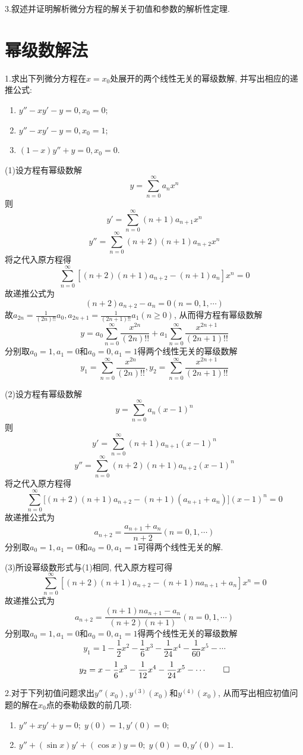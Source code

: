 3.叙述并证明解析微分方程的解关于初值和参数的解析性定理.


\section{幂级数解法}


1.求出下列微分方程在$x=x_0$处展开的两个线性无关的幂级数解, 并写出相应的递推公式:
\begin{enumerate}[(1)]
\item $y''-xy'-y=0,x_0=0$;
\item $y''-xy'-y=0,x_0=1$;
\item $(1-x)y''+y=0,x_0=0$.
\end{enumerate}

\begin{solve}
(1)设方程有幂级数解\[y=\sum_{n=0}^{\infty}a_nx^n\] 则
\[y'=\sum_{n=0}^{\infty}(n+1)a_{n+1}x^n\]
\[y''=\sum_{n=0}^{\infty}(n+2)(n+1)a_{n+2}x^n\]
将之代入原方程得\[\sum_{n=0}^{\infty}[(n+2)(n+1)a_{n+2}-(n+1)a_n]x^n=0\]
故递推公式为\[(n+2)a_{n+2}-a_n=0(n=0,1,\cdots)\]
故$a_{2n}=\frac{1}{(2n)!!}a_0,a_{2n+1}=\frac{1}{(2n+1)!!}a_1(n\geq0)$, 从而得方程有幂级数解
\[y=a_0\sum_{n=0}^{\infty}\frac{x^{2n}}{(2n)!!}+a_1\sum_{n=0}^{\infty}\frac{x^{2n+1}}{(2n+1)!!}\]
分别取$a_0=1,a_1=0$和$a_0=0,a_1=1$得两个线性无关的幂级数解
\[y_1=\sum_{n=0}^{\infty}\frac{x^{2n}}{(2n)!!},y_2=\sum_{n=0}^{\infty}\frac{x^{2n+1}}{(2n+1)!!}\]

(2)设方程有幂级数解\[y=\sum_{n=0}^{\infty}a_n(x-1)^n\]
则\[y'=\sum_{n=0}^{\infty}(n+1)a_{n+1}(x-1)^n\]
\[y''=\sum_{n=0}^{\infty}(n+2)(n+1)a_{n+2}(x-1)^n\]
将之代入原方程得
\[\sum_{n=0}^{\infty}\big[(n+2)(n+1)a_{n+2}-(n+1)(a_{n+1}+a_n)\big](x-1)^n=0\]
故递推公式为\[a_{n+2}=\frac{a_{n+1}+a_n}{n+2}(n=0,1,\cdots)\]
分别取$a_0=1,a_1=0$和$a_0=0,a_1=1$可得两个线性无关的解.

(3)所设幂级数形式与(1)相同, 代入原方程可得
\[\sum_{n=0}^{\infty}[(n+2)(n+1)a_{n+2}-(n+1)na_{n+1}+a_n]x^n=0\]
故递推公式为
\[a_{n+2}=\frac{(n+1)na_{n+1}-a_n}{(n+2)(n+1)}(n=0,1,\cdots)\]
分别取$a_0=1,a_1=0$和$a_0=0,a_1=1$得两个线性无关的幂级数解
\[y_1=1-\frac{1}{2}x^2-\frac{1}{6}x^3-\frac{1}{24}x^4-\frac{1}{60}x^5-\cdots\]
\[y_2=x-\frac{1}{6}x^3-\frac{1}{12}x^4-\frac{1}{24}x^5-\cdots\qedhere\]
\end{solve}


2.对于下列初值问题求出$y''(x_0),y^{(3)}(x_0)$和$y^{(4)}(x_0)$, 从而写出相应初值问题的解在$x_0$点的泰勒级数的前几项:
\begin{enumerate}[(1)]
\item $y''+xy'+y=0;\;y(0)=1,y'(0)=0;$
\item $y''+(\sin x)y'+(\cos x)y=0;\;y(0)=0,y'(0)=1$.\
\end{enumerate}

